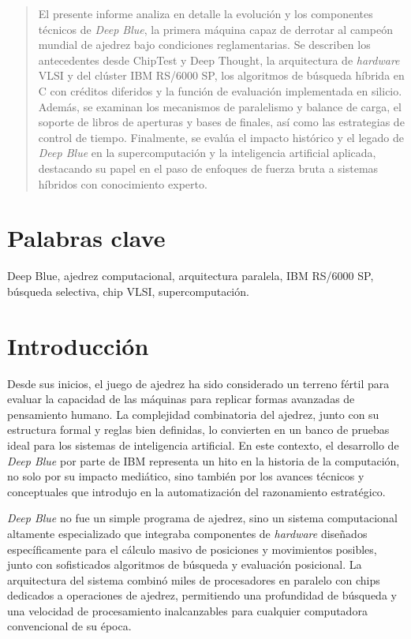 \documentclass[a4paper, 12pt]{article}
\begin{document}
\begin{abstract}
    El presente informe analiza en detalle la evolución y los 
    componentes técnicos de \textit{Deep Blue}, la primera 
    máquina capaz de derrotar al campeón mundial de ajedrez 
    bajo condiciones reglamentarias. Se describen los 
    antecedentes desde ChipTest y Deep Thought, la arquitectura 
    de \emph{hardware} VLSI y del clúster IBM RS/6000 SP, los 
    algoritmos de búsqueda híbrida en C con créditos diferidos y 
    la función de evaluación implementada en silicio. Además, 
    se examinan los mecanismos de paralelismo y balance de carga, 
    el soporte de libros de aperturas y bases de finales, así 
    como las estrategias de control de tiempo. Finalmente, se 
    evalúa el impacto histórico y el legado de \textit{Deep Blue} 
    en la supercomputación y la inteligencia artificial aplicada, 
    destacando su papel en el paso de enfoques de fuerza bruta a 
    sistemas híbridos con conocimiento experto.
\end{abstract}

\section*{Palabras clave}
Deep Blue, 
ajedrez computacional, 
arquitectura paralela, 
IBM RS/6000 SP, 
búsqueda selectiva,
chip VLSI,
supercomputación.
    

\newpage
\section{Introducción}

Desde sus inicios, el juego de ajedrez ha sido considerado un 
terreno fértil para evaluar la capacidad de las máquinas para 
replicar formas avanzadas de pensamiento humano. La complejidad 
combinatoria del ajedrez, junto con su estructura formal y 
reglas bien definidas, lo convierten en un banco de pruebas 
ideal para los sistemas de inteligencia artificial. En este 
contexto, el desarrollo de \textit{Deep Blue} por parte de IBM 
representa un hito en la historia de la computación, no solo por 
su impacto mediático, sino también por los avances técnicos y 
conceptuales que introdujo en la automatización del razonamiento 
estratégico.

\textit{Deep Blue} no fue un simple programa de ajedrez, sino un 
sistema computacional altamente especializado que integraba 
componentes de \emph{hardware} diseñados específicamente para el 
cálculo masivo de posiciones y movimientos posibles, junto con 
sofisticados algoritmos de búsqueda y evaluación posicional. La 
arquitectura del sistema combinó miles de procesadores en 
paralelo con chips dedicados a operaciones de ajedrez, 
permitiendo una profundidad de búsqueda y una velocidad de 
procesamiento inalcanzables para cualquier computadora 
convencional de su época.
\end{document}
